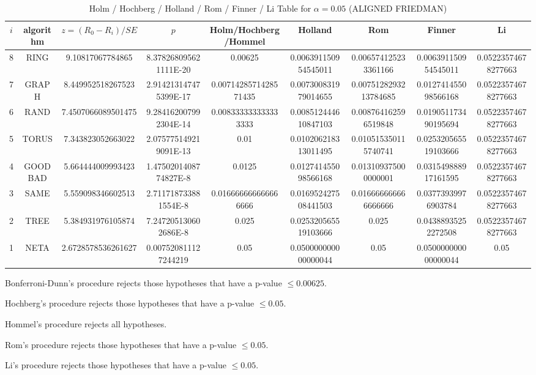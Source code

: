\documentclass[a4paper,10pt]{article}
\begin{document}
\begin{landscape}
\newpage

\begin{table}[!htp]
\centering\scriptsize
\caption{Holm / Hochberg / Holland / Rom / Finner / Li Table for $\alpha=0.05$ (ALIGNED FRIEDMAN)}
\begin{tabular}{ccccccccc}
$i$&algorithm&$z=(R_0 - R_i)/SE$&$p$&Holm/Hochberg/Hommel&Holland&Rom&Finner&Li\\
\hline
8& RING&9.10817067784865&8.378268095621111E-20&0.00625&0.006391150954545011&0.006574125233361166&0.006391150954545011&0.05223574678277663\\
7& GRAPH&8.449952518267523&2.914213147475399E-17&0.0071428571428571435&0.007300831979014655&0.0075128293213784685&0.012741455098566168&0.05223574678277663\\
6& RAND&7.4507066089501475&9.284162007992304E-14&0.008333333333333333&0.008512444610847103&0.008764162596519848&0.019051173490195694&0.05223574678277663\\
5& TORUS&7.343823052663022&2.075775149219091E-13&0.01&0.010206218313011495&0.010515350115740741&0.025320565519103666&0.05223574678277663\\
4& GOODBAD&5.664444009993423&1.4750201408774827E-8&0.0125&0.012741455098566168&0.013109375000000001&0.031549888917161595&0.05223574678277663\\
3& SAME&5.559098346602513&2.711718733881554E-8&0.016666666666666666&0.016952427508441503&0.016666666666666666&0.03773939976903784&0.05223574678277663\\
2& TREE&5.384931976105874&7.247205130602686E-8&0.025&0.025320565519103666&0.025&0.04388935252272508&0.05223574678277663\\
1& NETA&2.6728578536261627&0.007520811127244219&0.05&0.050000000000000044&0.05&0.050000000000000044&0.05\\
\hline
\end{tabular}
\end{table}
Bonferroni-Dunn's procedure rejects those hypotheses that have a p-value $\le0.00625$.


Hochberg's procedure rejects those hypotheses that have a p-value $\le0.05$.


Hommel's procedure rejects all hypotheses.


Rom's procedure rejects those hypotheses that have a p-value $\le0.05$.


Li's procedure rejects those hypotheses that have a p-value $\le0.05$.



\newpage


\end{landscape}
\end{document}
